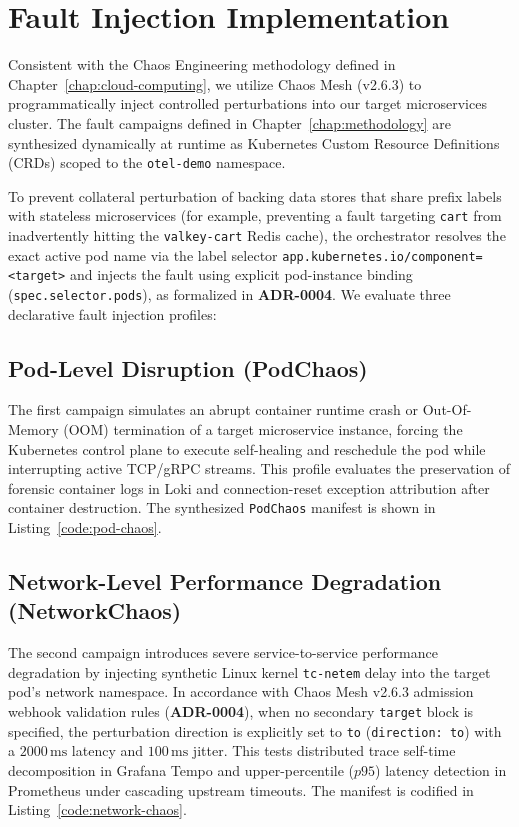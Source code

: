 \section{Fault Injection Implementation}
\label{sec:fault-injection-impl}

Consistent with the Chaos Engineering methodology defined in Chapter~\ref{chap:cloud-computing}, we utilize Chaos Mesh (v2.6.3) to programmatically inject controlled perturbations into our target microservices cluster. The fault campaigns defined in Chapter~\ref{chap:methodology} are synthesized dynamically at runtime as Kubernetes Custom Resource Definitions (CRDs) scoped to the \texttt{otel-demo} namespace.

To prevent collateral perturbation of backing data stores that share prefix labels with stateless microservices (for example, preventing a fault targeting \texttt{cart} from inadvertently hitting the \texttt{valkey-cart} Redis cache), the orchestrator resolves the exact active pod name via the label selector \texttt{app.kubernetes.io/component=<target>} and injects the fault using explicit pod-instance binding (\texttt{spec.selector.pods}), as formalized in \textbf{ADR-0004}. We evaluate three declarative fault injection profiles:

\subsection{Pod-Level Disruption (PodChaos)}
The first campaign simulates an abrupt container runtime crash or Out-Of-Memory (OOM) termination of a target microservice instance, forcing the Kubernetes control plane to execute self-healing and reschedule the pod while interrupting active TCP/gRPC streams. This profile evaluates the preservation of forensic container logs in Loki and connection-reset exception attribution after container destruction. The synthesized \texttt{PodChaos} manifest is shown in Listing~\ref{code:pod-chaos}.



\subsection{Network-Level Performance Degradation (NetworkChaos)}
The second campaign introduces severe service-to-service performance degradation by injecting synthetic Linux kernel \texttt{tc-netem} delay into the target pod's network namespace. In accordance with Chaos Mesh v2.6.3 admission webhook validation rules (\textbf{ADR-0004}), when no secondary \texttt{target} block is specified, the perturbation direction is explicitly set to \texttt{to} (\texttt{direction: to}) with a $2000\,\text{ms}$ latency and $100\,\text{ms}$ jitter. This tests distributed trace self-time decomposition in Grafana Tempo and upper-percentile ($p95$) latency detection in Prometheus under cascading upstream timeouts. The manifest is codified in Listing~\ref{code:network-chaos}.

